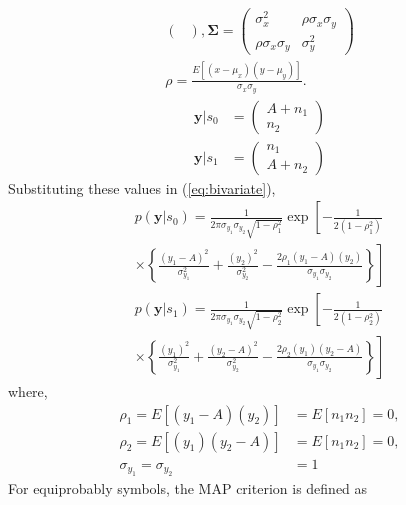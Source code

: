 \documentclass{article}
\numberwithin{equation}{subsection}
\numberwithin{figure}{subsection}
\providecommand{\mbf}{\mathbf}
\providecommand{\cbrak}[1]{\ensuremath{\left\{#1\right\}}}
\providecommand{\brak}[1]{\ensuremath{\left(#1\right)}}
\providecommand{\lsbrak}[1]{\ensuremath{{}\left[#1\right.}}
\providecommand{\rsbrak}[1]{\ensuremath{{}\left.#1\right]}}
\providecommand{\sbrak}[1]{\ensuremath{{}\left[#1\right]}}
\renewcommand\thesection{\arabic{section}}
\renewcommand\thesubsection{\thesection.\arabic{subsection}}
\begin{document}
\begin{enumerate}[label=\thesubsection.\arabic*,ref=\thesubsection.\arabic{figure}]
\begin{align}
\begin{pmatrix}
\end{pmatrix} , \mbf{\Sigma} = \begin{pmatrix}
\sigma_x^2 & \rho\sigma_x\sigma_y \\
    \rho\sigma_x\sigma_y & \sigma_y^2
\end{pmatrix} \\
\rho = \frac{E\sbrak{\brak{x - \mu_x}\brak{y-\mu_y}}}{\sigma_x\sigma_y}.
    \end{align}
        \begin{align}
        \mbf{y}|s_0 &= 
        \begin{pmatrix}
        A+n_1 \\
        n_2
        \end{pmatrix}\\
        \mbf{y}|s_1 &=  
        \begin{pmatrix}
        n_1 \\
        A+n_2
        \end{pmatrix}
        \end{align}
        Substituting these values in (\ref{eq:bivariate}),
        \begin{multline}
        \label{gauss_mutl_var1}
        p\brak{\mbf{y}|s_0} = \frac{1}{2\pi\sigma_{y_1}\sigma_{y_2}\sqrt{1-\rho_1^2}}\exp\lsbrak{-\frac{1}{2\brak{1-\rho_1^2}}}
        \\
        \times \rsbrak{\cbrak{\frac{\brak{y_1-A}^2}{\sigma_{y_1}^2}+\frac{\brak{y_2}^2}{\sigma_{y_2}^2}-\frac{2\rho_1\brak{y_1-A}\brak{y_2}}{\sigma_{y_1}\sigma_{y_2}}}}
        \end{multline}
        \begin{multline}
        \label{gauss_mutl_var2}
        p\brak{\mbf{y}|s_1} = \frac{1}{2\pi\sigma_{y_1}\sigma_{y_2}\sqrt{1-\rho_2^2}}\exp\lsbrak{-\frac{1}{2\brak{1-\rho_2^2}}}
        \\
        \times \rsbrak{\cbrak{\frac{\brak{y_1}^2}{\sigma_{y_1}^2}+\frac{\brak{y_2-A}^2}{\sigma_{y_2}^2}-\frac{2\rho_2\brak{y_1}\brak{y_2-A}}{\sigma_{y_1}\sigma_{y_2}}}}
        \end{multline}
        where,
        \begin{align}
        \label{rho_sig_val}
        \rho_1 = E[(y_1-A)(y_2)] &= E[n_1 n_2] = 0, \nonumber \\
        \rho_2 = E[(y_1)(y_2-A)] &= E[n_1 n_2] = 0, \nonumber \\
        \sigma_{y_1} = \sigma_{y_2} &= 1
        \end{align}
         For equiprobably symbols, the MAP criterion is defined as

\end{enumerate}
\end{document}
